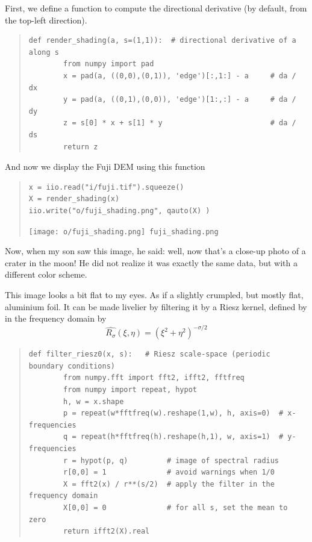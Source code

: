 First, we define a function to compute the directional derivative (by
default, from the top-left direction).

\begin{quote}
\begin{verbatim}
def render_shading(a, s=(1,1)):  # directional derivative of a along s
        from numpy import pad
        x = pad(a, ((0,0),(0,1)), 'edge')[:,1:] - a     # da / dx
        y = pad(a, ((0,1),(0,0)), 'edge')[1:,:] - a     # da / dy
        z = s[0] * x + s[1] * y                         # da / ds
        return z
\end{verbatim}
\end{quote}


And now we display the Fuji DEM using this function


\begin{quote}
\begin{verbatim}
x = iio.read("i/fuji.tif").squeeze()
X = render_shading(x)
iio.write("o/fuji_shading.png", qauto(X) )
\end{verbatim}
\texttt{[image: o/fuji\_shading.png]}~\verb+fuji_shading.png+
\end{quote}

Now, when my son saw this image, he said: well, now that's a close-up photo of a
crater in the moon!  He did not realize it was exactly the same data, but
with a different color scheme.

This image looks a bit flat to my eyes.
As if a slightly crumpled, but mostly flat, aluminium foil.
It can be made livelier by filtering it by a Riesz kernel, defined by
in the frequency domain by
\[
	\widehat{R_\sigma}(\xi,\eta)
	=
	\left(\xi^2+\eta^2\right)^{-\sigma/2}
\]

\begin{quote}
\begin{verbatim}
def filter_riesz0(x, s):   # Riesz scale-space (periodic boundary conditions)
        from numpy.fft import fft2, ifft2, fftfreq
        from numpy import repeat, hypot
        h, w = x.shape
        p = repeat(w*fftfreq(w).reshape(1,w), h, axis=0)  # x-frequencies
        q = repeat(h*fftfreq(h).reshape(h,1), w, axis=1)  # y-frequencies
        r = hypot(p, q)         # image of spectral radius
        r[0,0] = 1              # avoid warnings when 1/0
        X = fft2(x) / r**(s/2)  # apply the filter in the frequency domain
        X[0,0] = 0              # for all s, set the mean to zero
        return ifft2(X).real
\end{verbatim}
\end{quote}

